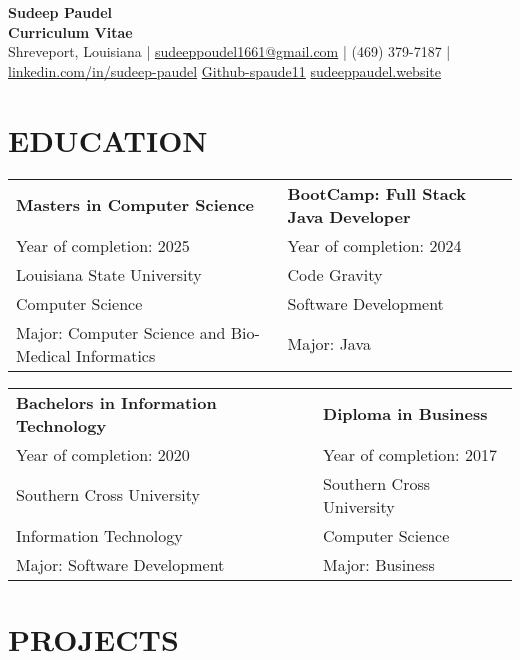 \documentclass[a4paper,9pt]{article}
\begin{document}
\pagestyle{empty}

\begin{center}
\textbf{\Large Sudeep Paudel}\\[3pt] %
\textbf{Curriculum Vitae}\\[1pt] %
Shreveport, Louisiana | \href{mailto:sudeeppoudel1661@gmail.com}{sudeeppoudel1661@gmail.com} |
(469) 379-7187 | \href{https://www.linkedin.com/in/sudeep-paudel-4853ab28b/}{linkedin.com/in/sudeep-paudel} \href{https://github.com/spaude11}{Github-spaude11}   
 \href{https://www.sudeeppaudel.website/}{sudeeppaudel.website}
\end{center}

\section*{EDUCATION}

\noindent
\begin{tabular}{@{}p{} p{}@{}}
    \textbf{Masters in Computer Science} & \textbf{BootCamp: Full Stack Java Developer} \\
    Year of completion: 2025 & Year of completion: 2024 \\
    Louisiana State University & Code Gravity \\
    Computer Science & Software Development \\
    Major: Computer Science and Bio-Medical Informatics & Major: Java \\
\end{tabular}

\noindent
\begin{tabular}{@{}p{} p{}@{}}
    \textbf{Bachelors in Information Technology} & \textbf{Diploma in Business} \\
    Year of completion: 2020 & Year of completion: 2017 \\
    Southern Cross University & Southern Cross University \\
    Information Technology & Computer Science \\
    Major: Software Development & Major: Business \\
\end{tabular}

\noindent


\section*{PROJECTS}
\end{document}
